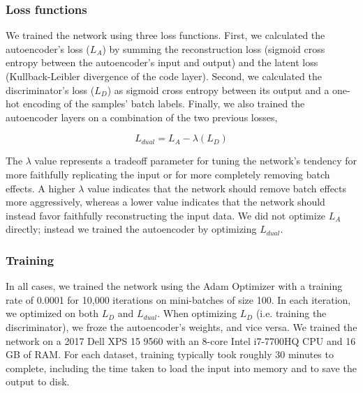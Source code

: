 \documentclass[notitlepage]{article}
\begin{document}
\subsubsection{Loss functions}

We trained the network using three loss functions.
First, we calculated the autoencoder's loss ($L_A$) by summing the reconstruction loss (sigmoid cross entropy between the autoencoder's input and output) and the latent loss (Kullback-Leibler divergence \cite{kullback_information_1951} of the code layer).
Second, we calculated the discriminator's loss ($L_D$) as sigmoid cross entropy between its output and a one-hot encoding of the samples' batch labels.
Finally, we also trained the autoencoder layers on a combination of the two previous losses,

\begin{equation}
	\label{dual_loss}
	L_{dual} = L_A - \lambda{}(L_D)
\end{equation}

The $\lambda$ value represents a tradeoff parameter for tuning the network's tendency for more faithfully replicating the input or for more completely removing batch effects.
A higher $\lambda$ value indicates that the network should remove batch effects more aggressively, whereas a lower value indicates that the network should instead favor faithfully reconstructing the input data.
We did not optimize $L_A$ directly; instead we trained the autoencoder by optimizing $L_{dual}$.

\subsubsection{Training}

In all cases, we trained the network using the Adam Optimizer \cite{kingma_adam_2014} with a training rate of 0.0001 for 10,000 iterations on mini-batches of size 100.
In each iteration, we optimized on both $L_D$ and $L_{dual}$.
When optimizing $L_D$ (i.e. training the discriminator), we froze the autoencoder's weights, and vice versa.
We trained the network on a 2017 Dell XPS 15 9560 with an 8-core Intel i7-7700HQ CPU and 16 GB of RAM.
For each dataset, training typically took roughly 30 minutes to complete, including the time taken to load the input into memory and to save the output to disk.
\end{document}

